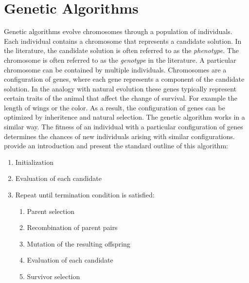 \section{Genetic Algorithms}
\label{sec:background_genetic_algorithms}
Genetic algorithms \citep{Holland1992} evolve chromosomes through a population of individuals. Each individual contains a
chromosome that represents a candidate solution. In the literature, the
candidate solution is often referred to as the \emph{phenotype}. The chromosome
is often referred to as the \emph{genotype} in the literature. A particular
chromosome can be contained by multiple individuals. Chromosomes are a
configuration of genes, where each gene represents a component of the candidate
solution. In the analogy with natural evolution these genes typically represent
certain traits of the animal that affect the change of survival. For example
the length of wings or the color. As a result, the configuration of genes can be
optimized by inheritence and natural selection. The genetic algorithm works in a
similar way. The fitness of an individual with a particular configuration
of genes determines the chances of new individuals arising with similar
configurations. \citet{Eiben2007} provide an introduction and present the standard outline of this algorithm:
\begin{enumerate}
	\item Initialization
	\item Evaluation of each candidate
	\item Repeat until termination condition is satisfied:
		\begin{enumerate}
			\item Parent selection
			\item Recombination of parent pairs
			\item Mutation of the resulting offspring
			\item Evaluation of each candidate
			\item Survivor selection
		\end{enumerate}
\end{enumerate}
